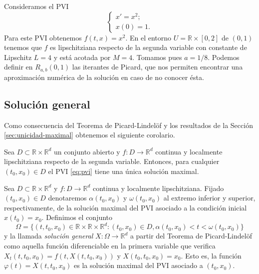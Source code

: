 \documentclass{article}
\begin{document}
\begin{ex}
  Consideramos el PVI
  \begin{equation}
    \begin{cases}
      x' = x^2; \\ x(0) = 1.
    \end{cases}
  \end{equation}
  Para este PVI obtenemos $f(t,x) = x^2$. En el entorno $U = \mathbb{R} \times [0,2]$ de $(0,1)$
  tenemos que $f$ es lipschitziana respecto de la segunda variable con constante de Lipschitz
  $L = 4$ y está acotada por $M = 4$. Tomamos pues $a = 1/8$. Podemos definir en $R_{a,b}(0,1)$ las
  iterantes de Picard, que nos permiten encontrar una aproximación numérica de la solución en caso
  de no conocer ésta.
\end{ex}

\subsection{Solución general} \label{sec:existencia-unicidad:general}

Como consecuencia del Teorema de Picard-Lindelöf y los resultados de la Sección
\ref{sec:unicidad-maximal} obtenemos el siguiente corolario.

\begin{cor} \label{cor:picard:maximal} Sea $D \subset \mathbb{R} \times \mathbb{R}^d$ un conjunto
  abierto y $f : D \to \mathbb{R}^d$ continua y localmente lipschitziana respecto de la segunda
  variable. Entonces, para cualquier $(t_0, x_0) \in D$ el PVI \eqref{eq:pvi} tiene una única
  solución maximal.
\end{cor}

\begin{definition}
  Sea $D \subset \mathbb{R} \times \mathbb{R}^d$ y $f \colon D \to \mathbb{R}^d$ continua y localmente
  lipschitziana. Fijado $(t_0, x_0) \in D$ denotaremos $\alpha(t_0, x_0)$ y $\omega(t_0, x_0)$ al
  extremo inferior y superior, respectivamente, de la solución maximal del PVI asociado a la
  condición inicial $x(t_0) = x_0$. Definimos el conjunto
  \[\Omega = \{(t, t_0, x_0) \in \mathbb{R}\times\mathbb{R}\times\mathbb{R}^d : (t_0, x_0) \in D,
    \alpha(t_0, x_0) < t < \omega(t_0, x_0)\}\] y la llamada \emph{solución general}
  $X: \Omega \to \mathbb{R}^d$ a partir del Teorema de Picard-Lindelöf como aquella función
  diferenciable en la primera variable que verifica $X_t(t, t_0, x_0) = f(t, X(t, t_0, x_0))$ y
  $X(t_0, t_0, x_0) = x_0$. Esto es, la función $\varphi(t) = X(t, t_0, x_0)$ es la solución maximal
  del PVI asociado a $(t_0, x_0)$.
\end{definition}
\end{document}
